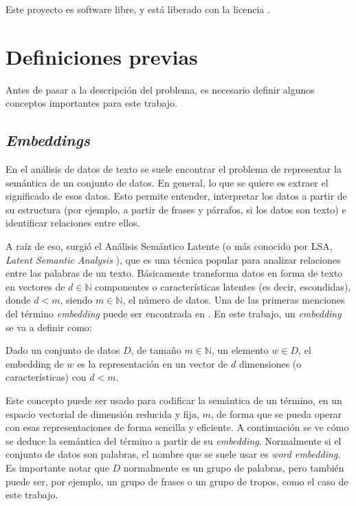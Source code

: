 Este proyecto es software libre, y está liberado con la licencia \cite{gplv3}.

\section*{Definiciones previas}

Antes de pasar a la descripción del problema, es necesario definir algunos conceptos importantes para
este trabajo.

\subsection*{\textit{Embeddings}}

En el análisis de datos de texto se suele encontrar el problema de representar la semántica de un conjunto de datos.
En general, lo que se quiere es extraer el significado de esos datos. Esto permite entender, interpretar los datos
a partir de su estructura (por ejemplo, a partir de frases y párrafos, si los datos son texto) e identificar relaciones
entre ellos.

A raíz de eso, surgió el Análisis Semántico Latente (o más conocido por LSA, \textit{Latent Semantic Analysis} \cite{dumais2004latent}),
que es una técnica popular para analizar relaciones entre las palabras de un texto. Básicamente transforma datos en forma de texto en vectores de $d\in\mathbb{N}$
componentes o características latentes (es decir, escondidas), donde $d<m$, siendo $m\in\mathbb{N}$, el número de
datos. Una de las primeras menciones del término \textit{embedding} puede ser encontrada en \cite{landauer1997learning}.
En este trabajo, un \textit{embedding} se va a definir como:

\begin{definition}
    Dado un conjunto de datos $D$, de tamaño $m\in\mathbb{N}$, un elemento $w\in D$, el embedding de $w$ es
    la representación en un vector de $d$ dimensiones (o características) con $d<m$.
\end{definition}

Este concepto puede ser usado para codificar la semántica de un término, en un espacio vectorial de dimensión reducida
y fija, $m$, de forma que se pueda operar con esas representaciones de forma sencilla y eficiente. A continuación se ve cómo
se deduce la semántica del término a partir de su \textit{embedding}. Normalmente si el conjunto de datos son palabras, el nombre
que se suele usar es \textit{word embedding}. Es importante notar que $D$ normalmente es un grupo de palabras, pero también puede ser,
por ejemplo, un grupo de frases \cite{lin2017structured} o un grupo de tropos, como el caso de este trabajo.

